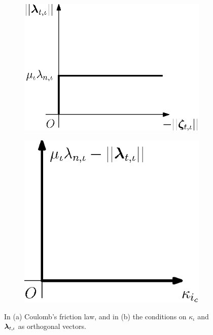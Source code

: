 \documentclass[../DC2017114Bouma.tex]{subfiles}
\begin{document}
\begin{figure}[h]
\centering
\begin{subfigure}{0.38\textwidth}
\centering
\includegraphics[width=\linewidth]{coulombfriction.eps}\caption{}\label{fig:coulombfriction}
\end{subfigure}
\qquad
\begin{subfigure}{0.3\textwidth}
\centering
\includegraphics[width=\linewidth]{coulombort.eps}\caption{}\label{fig:coulombort}
\end{subfigure}
\caption{In \textnormal{(a)} Coulomb's friction law, and in \textnormal{(b)} the conditions on $\kappa_{\iota}$ and $\boldsymbol{\lambda}_{t,\iota}$ as orthogonal vectors.}
\end{figure}
\end{document}
